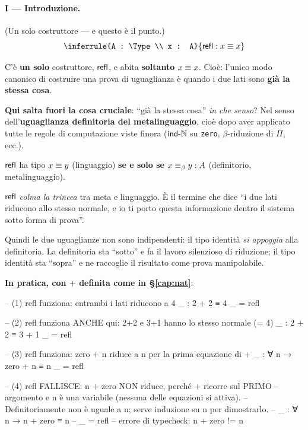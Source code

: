 \paragraph{I --- Introduzione.} (Un solo costruttore --- e questo \`e il punto.)
\[
\inferrule{A : \Type \\ x : A}{\refl : x \identita x}
\]

C'\`e \textbf{un solo} costruttore, $\mathsf{refl}$, e abita \textbf{soltanto} $x \equiv x$. Cio\`e: l'unico modo canonico di costruire una prova di uguaglianza \`e quando i due lati sono \textbf{gi\`a la stessa cosa}.

\bigskip

\noindent\textbf{Qui salta fuori la cosa cruciale}: ``gi\`a la stessa cosa'' \emph{in che senso}? Nel senso dell'\textbf{uguaglianza definitoria del metalinguaggio}, cio\`e dopo aver applicato tutte le regole di computazione viste finora ($\mathsf{ind\text{-}\mathbb{N}}$ su \texttt{zero}, $\beta$-riduzione di $\Pi$, ecc.).

\begin{regola}[Il ponte]\label{reg:ponte}
$\mathsf{refl}$ ha tipo $x \equiv y$ (linguaggio) \textbf{se e solo se} $x \equiv_{\beta} y : A$ (definitorio, metalinguaggio).
\end{regola}

$\mathsf{refl}$ \emph{colma la trincea} tra meta e linguaggio. \`E il termine che dice ``i due lati riducono allo stesso normale, e io ti porto questa informazione dentro il sistema sotto forma di prova''.

Quindi le due uguaglianze non sono indipendenti: il tipo identit\`a \emph{si appoggia} alla definitoria. La definitoria sta ``sotto'' e fa il lavoro silenzioso di riduzione; il tipo identit\`a sta ``sopra'' e ne raccoglie il risultato come prova manipolabile.

\bigskip

\noindent\textbf{In pratica, con $+$ definita come in \S\ref{cap:nat}}:
\begin{agda}
-- (1) refl funziona: entrambi i lati riducono a 4
_ : 2 + 2 ≡ 4
_ = refl

-- (2) refl funziona ANCHE qui: 2+2 e 3+1 hanno lo stesso normale (= 4)
_ : 2 + 2 ≡ 3 + 1
_ = refl

-- (3) refl funziona: zero + n riduce a n per la prima equazione di +
_ : ∀ {n} → zero + n ≡ n
_ = refl

-- (4) refl FALLISCE: n + zero NON riduce, perché + ricorre sul PRIMO
--     argomento e n è una variabile (nessuna delle equazioni si attiva).
--     Definitoriamente non è uguale a n; serve induzione su n per dimostrarlo.
-- _ : ∀ {n} → n + zero ≡ n
-- _ = refl   -- errore di typecheck: n + zero != n
\end{agda}

